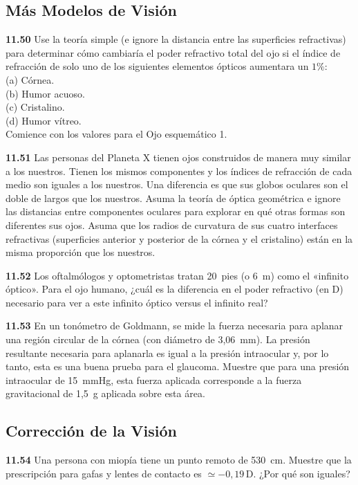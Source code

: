 \documentclass[12pt]{book}
\begin{document}
\subsection*{Más Modelos de Visión}

\textbf{11.50} Use la teoría simple (e ignore la distancia entre las superficies refractivas) para determinar cómo cambiaría el poder refractivo total del ojo si el índice de refracción de solo uno de los siguientes elementos ópticos aumentara un $1\%$:\\
(a) Córnea.\\
(b) Humor acuoso.\\
(c) Cristalino.\\
(d) Humor vítreo.\\
Comience con los valores para el Ojo esquemático 1.

\textbf{11.51} Las personas del Planeta X tienen ojos construidos de manera muy similar a los nuestros. Tienen los mismos componentes y los índices de refracción de cada medio son iguales a los nuestros. Una diferencia es que sus globos oculares son el doble de largos que los nuestros. Asuma la teoría de óptica geométrica e ignore las distancias entre componentes oculares para explorar en qué otras formas son diferentes sus ojos. Asuma que los radios de curvatura de sus cuatro interfaces refractivas (superficies anterior y posterior de la córnea y el cristalino) están en la misma proporción que los nuestros.

\textbf{11.52} Los oftalmólogos y optometristas tratan 20~pies (o 6~m) como el «infinito óptico». Para el ojo humano, ¿cuál es la diferencia en el poder refractivo (en D) necesario para ver a este infinito óptico versus el infinito real?

\textbf{11.53} En un tonómetro de Goldmann, se mide la fuerza necesaria para aplanar una región circular de la córnea (con diámetro de 3,06~mm). La presión resultante necesaria para aplanarla es igual a la presión intraocular y, por lo tanto, esta es una buena prueba para el glaucoma. Muestre que para una presión intraocular de 15~mmHg, esta fuerza aplicada corresponde a la fuerza gravitacional de 1,5~g aplicada sobre esta área.

\subsection*{Corrección de la Visión}

\textbf{11.54} Una persona con miopía tiene un punto remoto de 530~cm. Muestre que la prescripción para gafas y lentes de contacto es $\simeq -0{,}19\,\text{D}$. ¿Por qué son iguales?
\end{document}

